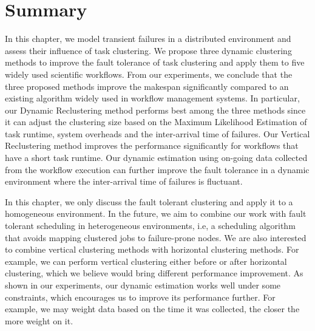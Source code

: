\section{Summary}
In this chapter, we model transient failures in a distributed environment and assess their influence of task clustering. We propose three dynamic clustering methods to improve the fault tolerance of task clustering and apply them to five widely used scientific workflows. From our experiments, we conclude that the three proposed methods improve the makespan significantly compared to an existing algorithm widely used in workflow management systems. In particular, our Dynamic Reclustering method performs best among the three methods since it can adjust the clustering size based on the Maximum Likelihood Estimation of task runtime, system overheads and the inter-arrival time of failures. Our Vertical Reclustering method improves the performance significantly for  workflows that have a short task runtime. Our dynamic estimation using on-going data collected from the workflow execution can further improve the fault tolerance in a dynamic environment where the inter-arrival time of failures is fluctuant. 

In this chapter, we only discuss the fault tolerant clustering and apply it to a homogeneous environment. In the future, we aim to combine our work with fault tolerant scheduling in heterogeneous environments, i.e, a scheduling algorithm that avoids mapping clustered jobs to failure-prone nodes. We are also interested to combine vertical clustering methods with horizontal clustering methods. For example, we can perform vertical clustering either before or after horizontal clustering, which we believe would bring different performance improvement. 
As shown in our experiments, our dynamic estimation works well under some constraints, which encourages us to improve its performance further. For example, we may weight data based on the time it was collected, the closer the more weight on it. 


